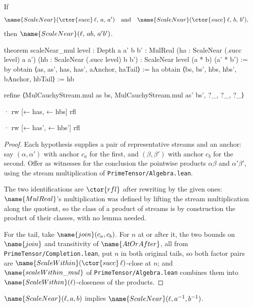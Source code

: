 \begin{theorem}
\label{Analysis:Near:Laws:thm:near-mul}
If
\[
  \name{ScaleNear}(\ctor{succ}\,\ell,\, a,\, a')
  \quad\text{and}\quad
  \name{ScaleNear}(\ctor{succ}\,\ell,\, b,\, b'),
\]
then $\name{ScaleNear}(\ell,\, a b,\, a' b')$.
\end{theorem}

\begin{leancode}
theorem scaleNear_mul {level : Depth} {a a' b b' : MulReal}
    (ha : ScaleNear (.succ level) a a')
    (hb : ScaleNear (.succ level) b b') :
    ScaleNear level (a * b) (a' * b') := by
  obtain ⟨as, as', has, has', aAnchor, haTail⟩ := ha
  obtain ⟨bs, bs', hbs, hbs', bAnchor, hbTail⟩ := hb

  refine ⟨MulCauchyStream.mul as bs,
    MulCauchyStream.mul as' bs', ?_, ?_, ?_⟩

  · rw [← has, ← hbs]
    rfl

  · rw [← has', ← hbs']
    rfl
\end{leancode}

\begin{proof}
Each hypothesis supplies a pair of representative streams and an anchor: say
$(\alpha, \alpha')$ with anchor $c_a$ for the first, and $(\beta, \beta')$ with
anchor $c_b$ for the second.  Offer as witnesses for the conclusion the
pointwise products $\alpha\beta$ and $\alpha'\beta'$, using the stream
multiplication of \texttt{PrimeTensor/Algebra.lean}.

The two identifications are $\ctor{rfl}$ after rewriting by the given ones:
$\name{MulReal}$'s multiplication was defined by lifting the stream
multiplication along the quotient, so the class of a product of streams is by
construction the product of their classes, with no lemma needed.

For the tail, take $\name{join}(c_a, c_b)$.  For $n$ at or after it, the two
bounds on $\name{join}$ and transitivity of $\name{AtOrAfter}$, all from
\texttt{PrimeTensor/Completion.lean}, put $n$ in both original tails, so both
factor pairs are $\name{ScaleWithin}(\ctor{succ}\,\ell)$-close at $n$; and
$\name{scaleWithin\_mul}$ of \texttt{PrimeTensor/Algebra.lean} combines them
into $\name{ScaleWithin}(\ell)$-closeness of the products.
\end{proof}

\begin{theorem}
\label{Analysis:Near:Laws:thm:near-inv}
$\name{ScaleNear}(\ell, a, b)$ implies $\name{ScaleNear}(\ell, a^{-1}, b^{-1})$.
\end{theorem}

